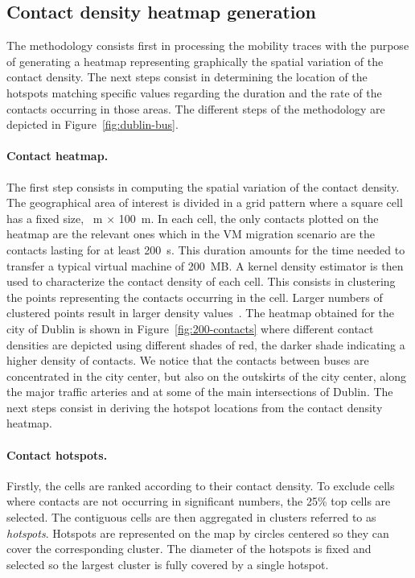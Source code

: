 \subsection{Contact density heatmap generation} 

The methodology consists first in processing the mobility traces with the purpose of generating a heatmap representing graphically the spatial variation of the contact density. The next steps consist in determining the location of the hotspots matching specific values regarding the duration and the rate of the contacts occurring in those areas. The different steps of the methodology are depicted in Figure~\ref{fig:dublin-bus}.

\paragraph{Contact heatmap.}
The first step consists in computing the spatial variation of the contact density. The geographical area of interest is divided in a grid pattern where a square cell has a fixed size, ~m $\times$ 100~m. In each cell, the only contacts plotted on the heatmap are the relevant ones which in the VM migration scenario are the contacts lasting for at least 200~s. This duration amounts for the time needed to transfer a typical virtual machine of 200~MB. A kernel density estimator is then used to characterize the contact density of each cell. This consists in clustering the points representing the contacts occurring in the cell. Larger numbers of clustered points result in larger density values~\cite{silverman1986density}. The heatmap obtained for the city of Dublin is shown in Figure~\ref{fig:200-contacts} where different contact densities are depicted using different shades of red, the darker shade indicating a higher density of contacts. We notice that the contacts between buses are concentrated in the city center, but also on the outskirts of the city center, along the major traffic arteries and at some of the main intersections of Dublin. The next steps consist in deriving the hotspot locations from the contact density heatmap.

\paragraph{Contact hotspots.} 
Firstly, the cells are ranked according to their contact density. To exclude cells where contacts are not occurring in significant numbers, the 25\% top cells are selected. The contiguous cells are then aggregated in clusters referred to as \textit{hotspots}. Hotspots are represented on the map by circles centered so they can cover the corresponding cluster. The diameter of the hotspots is fixed and selected so the largest cluster is fully covered by a single hotspot.

